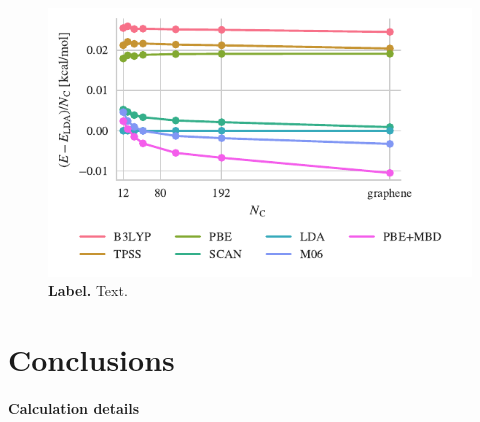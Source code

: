 \begin{figure}

\centering
\includegraphics{../media/flakes}
\caption{\textbf{Label.} Text.
}\label{fig:flakes}
\end{figure}

\section{Conclusions}

\paragraph{Calculation details}
